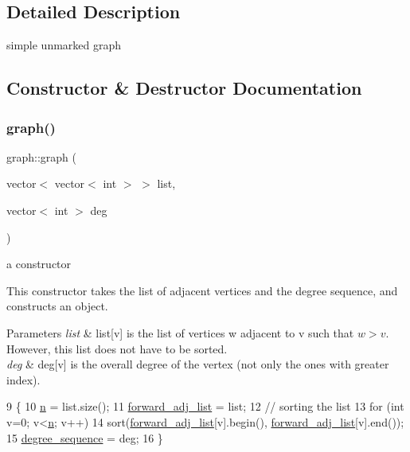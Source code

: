 \subsection{Detailed Description}
simple unmarked graph 

\subsection{Constructor \& Destructor Documentation}
\mbox{\label{classgraph_a0f89acfea28c8996a0d8df4d07e6ecf2}} 
\subsubsection{\texorpdfstring{graph()}{graph()}}
{\footnotesize\ttfamily graph\+::graph (\begin{DoxyParamCaption}\item[{vector$<$ vector$<$ int $>$ $>$}]{list,  }\item[{vector$<$ int $>$}]{deg }\end{DoxyParamCaption})}



a constructor 

This constructor takes the list of adjacent vertices and the degree sequence, and constructs an object. 
\begin{DoxyParams}{Parameters}
{\em list} & list\mbox{[}v\mbox{]} is the list of vertices w adjacent to v such that $w > v$. However, this list does not have to be sorted. \\
\hline
{\em deg} & deg\mbox{[}v\mbox{]} is the overall degree of the vertex (not only the ones with greater index). \\
\hline
\end{DoxyParams}

\begin{DoxyCode}
9                                                       \{
10   \hyperlink{classgraph_ac8b3474ce95c04087c312508ec1443b6}{n} = list.size();
11   \hyperlink{classgraph_a7d6441850d586d6a99fb73df57b70362}{forward\_adj\_list} = list;
12   \textcolor{comment}{// sorting the list}
13   \textcolor{keywordflow}{for} (\textcolor{keywordtype}{int} v=0; v<\hyperlink{classgraph_ac8b3474ce95c04087c312508ec1443b6}{n}; v++)
14     sort(\hyperlink{classgraph_a7d6441850d586d6a99fb73df57b70362}{forward\_adj\_list}[v].begin(), \hyperlink{classgraph_a7d6441850d586d6a99fb73df57b70362}{forward\_adj\_list}[v].end());
15   \hyperlink{classgraph_a0b31295672bfe37669c9eb3640977fe6}{degree\_sequence} = deg;
16 \}
\end{DoxyCode}


